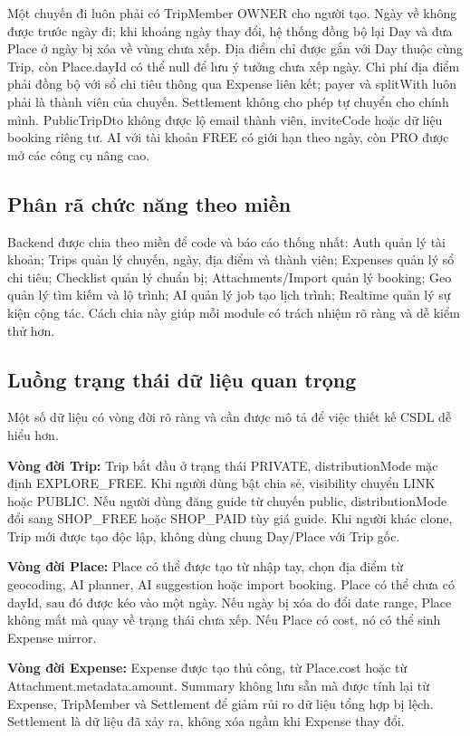\documentclass[a4paper]{report}
\begin{document}
Một chuyến đi luôn phải có TripMember OWNER cho người tạo. Ngày về không được trước ngày đi; khi khoảng ngày thay đổi, hệ thống đồng bộ lại Day và đưa Place ở ngày bị xóa về vùng chưa xếp. Địa điểm chỉ được gắn với Day thuộc cùng Trip, còn Place.dayId có thể null để lưu ý tưởng chưa xếp ngày. Chi phí địa điểm phải đồng bộ với sổ chi tiêu thông qua Expense liên kết; payer và splitWith luôn phải là thành viên của chuyến. Settlement không cho phép tự chuyển cho chính mình. PublicTripDto không được lộ email thành viên, inviteCode hoặc dữ liệu booking riêng tư. AI với tài khoản FREE có giới hạn theo ngày, còn PRO được mở các công cụ nâng cao.

\subsection{Phân rã chức năng theo miền}

Backend được chia theo miền để code và báo cáo thống nhất: Auth quản lý tài khoản; Trips quản lý chuyến, ngày, địa điểm và thành viên; Expenses quản lý sổ chi tiêu; Checklist quản lý chuẩn bị; Attachments/Import quản lý booking; Geo quản lý tìm kiếm và lộ trình; AI quản lý job tạo lịch trình; Realtime quản lý sự kiện cộng tác. Cách chia này giúp mỗi module có trách nhiệm rõ ràng và dễ kiểm thử hơn.

\subsection{Luồng trạng thái dữ liệu quan trọng}

Một số dữ liệu có vòng đời rõ ràng và cần được mô tả để việc thiết kế CSDL dễ hiểu hơn.

\textbf{Vòng đời Trip:} Trip bắt đầu ở trạng thái PRIVATE, distributionMode mặc định EXPLORE\_FREE. Khi người dùng bật chia sẻ, visibility chuyển LINK hoặc PUBLIC. Nếu người dùng đăng guide từ chuyến public, distributionMode đổi sang SHOP\_FREE hoặc SHOP\_PAID tùy giá guide. Khi người khác clone, Trip mới được tạo độc lập, không dùng chung Day/Place với Trip gốc.

\textbf{Vòng đời Place:} Place có thể được tạo từ nhập tay, chọn địa điểm từ geocoding, AI planner, AI suggestion hoặc import booking. Place có thể chưa có dayId, sau đó được kéo vào một ngày. Nếu ngày bị xóa do đổi date range, Place không mất mà quay về trạng thái chưa xếp. Nếu Place có cost, nó có thể sinh Expense mirror.

\textbf{Vòng đời Expense:} Expense được tạo thủ công, từ Place.cost hoặc từ Attachment.metadata.amount. Summary không lưu sẵn mà được tính lại từ Expense, TripMember và Settlement để giảm rủi ro dữ liệu tổng hợp bị lệch. Settlement là dữ liệu đã xảy ra, không xóa ngầm khi Expense thay đổi.
\end{document}
